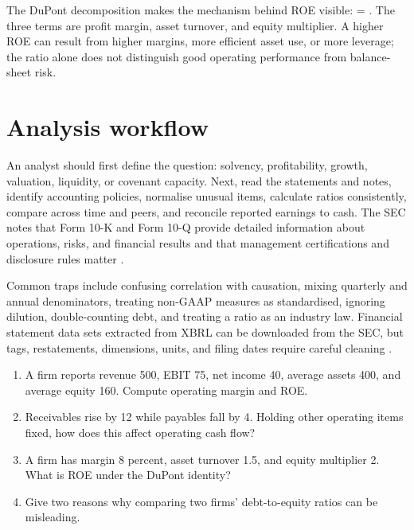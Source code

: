 The DuPont decomposition makes the mechanism behind ROE visible:
  =
  \times{}
  \times{}.
\closeformula
The three terms are profit margin, asset turnover, and equity multiplier. A higher ROE can result from higher margins, more efficient asset use, or more leverage; the ratio alone does not distinguish good operating performance from balance-sheet risk.

\section{Analysis workflow}
An analyst should first define the question: solvency, profitability, growth, valuation, liquidity, or covenant capacity. Next, read the statements and notes, identify accounting policies, normalise unusual items, calculate ratios consistently, compare across time and peers, and reconcile reported earnings to cash. The SEC notes that Form 10-K and Form 10-Q provide detailed information about operations, risks, and financial results and that management certifications and disclosure rules matter \cite{sec10k}.

Common traps include confusing correlation with causation, mixing quarterly and annual denominators, treating non-GAAP measures as standardised, ignoring dilution, double-counting debt, and treating a ratio as an industry law. Financial statement data sets extracted from XBRL can be downloaded from the SEC, but tags, restatements, dimensions, units, and filing dates require careful cleaning \cite{secdata}.

\begin{exerciseblock}
\begin{enumerate}
  \item A firm reports revenue 500, EBIT 75, net income 40, average assets 400, and average equity 160. Compute operating margin and ROE.
  \item Receivables rise by 12 while payables fall by 4. Holding other operating items fixed, how does this affect operating cash flow?
  \item A firm has margin 8 percent, asset turnover 1.5, and equity multiplier 2. What is ROE under the DuPont identity?
  \item Give two reasons why comparing two firms' debt-to-equity ratios can be misleading.
\end{enumerate}
\end{exerciseblock}

